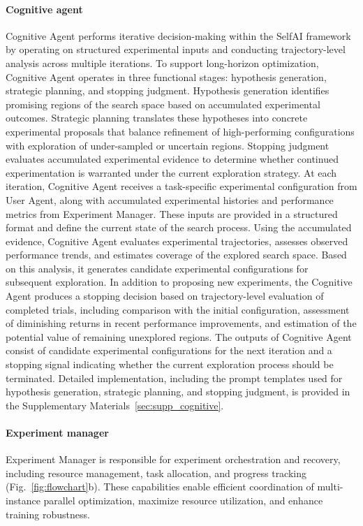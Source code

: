 \paragraph{Cognitive agent}
\label{sec:cognitive}
Cognitive Agent performs iterative decision-making within the SelfAI framework by operating on structured experimental inputs and conducting trajectory-level analysis across multiple iterations. To support long-horizon optimization, Cognitive Agent operates in three functional stages: hypothesis generation, strategic planning, and stopping judgment. Hypothesis generation identifies promising regions of the search space based on accumulated experimental outcomes. Strategic planning translates these hypotheses into concrete experimental proposals that balance refinement of high-performing configurations with exploration of under-sampled or uncertain regions. Stopping judgment evaluates accumulated experimental evidence to determine whether continued experimentation is warranted under the current exploration strategy. At each iteration, Cognitive Agent receives a task-specific experimental configuration from User Agent, along with accumulated experimental histories and performance metrics from Experiment Manager. These inputs are provided in a structured format and define the current state of the search process. Using the accumulated evidence, Cognitive Agent evaluates experimental trajectories, assesses observed performance trends, and estimates coverage of the explored search space. Based on this analysis, it generates candidate experimental configurations for subsequent exploration. In addition to proposing new experiments, the Cognitive Agent produces a stopping decision based on trajectory-level evaluation of completed trials, including comparison with the initial configuration, assessment of diminishing returns in recent performance improvements, and estimation of the potential value of remaining unexplored regions. The outputs of Cognitive Agent consist of candidate experimental configurations for the next iteration and a stopping signal indicating whether the current exploration process should be terminated. Detailed implementation, including the prompt templates used for hypothesis generation, strategic planning, and stopping judgment, is provided in the Supplementary Materials~\ref{sec:supp_cognitive}.


\paragraph{Experiment manager}
\label{sec:exp_management}
Experiment Manager is responsible for experiment orchestration and recovery, including resource management, task allocation, and progress tracking (Fig.~\ref{fig:flowchart}b). These capabilities enable efficient coordination of multi-instance parallel optimization, maximize resource utilization, and enhance training robustness.

